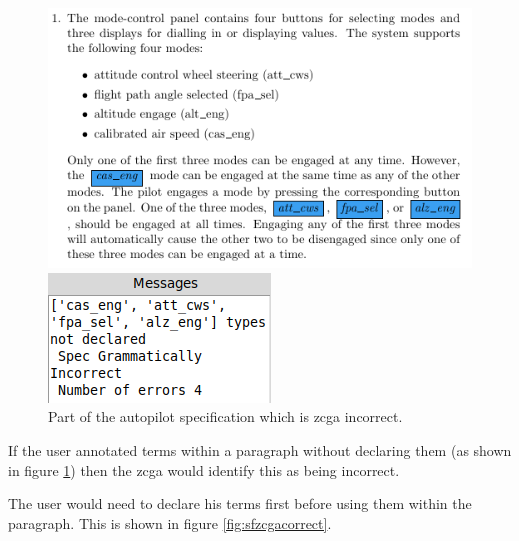 \begin{figure}[H]
     \centering
     \begin{minipage}{0.45\textwidth}
     \centering
     \includegraphics[scale=0.5]{Figures/fullexample/sfzcgaincorrect.png}
     \end{minipage}\hfill
     \begin{minipage}{0.45\textwidth}
     \centering
     \includegraphics[scale=0.5]{Figures/fullexample/sfoutputincorrect.png}
     \end{minipage}
     \caption{Part of the autopilot specification which is \gls{zcga} incorrect.\label{fig:sfzcgaincorrect}}
     \end{figure}

If the user annotated terms within a paragraph without declaring them (as shown
in figure \ref{fig:sfzcgaincorrect}) then the \gls{zcga} would identify this as being
incorrect.

The user would need to declare his terms first before using them within the
paragraph. This is shown in figure \ref{fig:sfzcgacorrect}.

